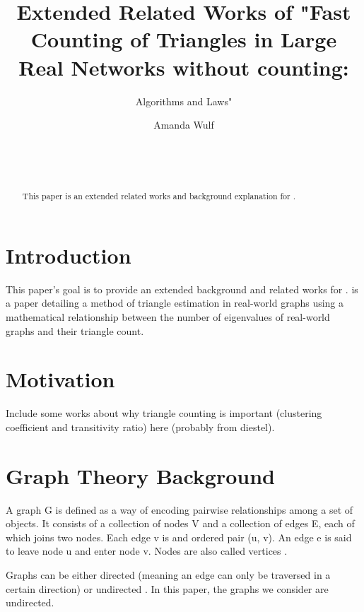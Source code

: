 \documentclass{acm_proc_article-sp}
\begin{document}
\title{Extended Related Works of "Fast Counting of Triangles in Large Real Networks without counting:}
\subtitle{Algorithms and Laws"}

\author{
\alignauthor
Amanda Wulf\\
       \\
       \\
       \\
}

\maketitle
\begin{abstract}
This paper is an extended related works and background explanation for
\cite{original}.
\end{abstract}

\section{Introduction}
This paper's goal is to provide an extended background and related works for
\cite{original}. \cite{original} is a paper detailing a method of triangle
estimation in real-world graphs using a mathematical relationship between the
number of eigenvalues of real-world graphs and their triangle count.

\section{Motivation}
Include some works about why triangle counting is important
(clustering coefficient and transitivity ratio) here (probably from diestel).

\section{Graph Theory Background}
A graph G is defined as a way of encoding pairwise relationships among a set of
objects. It consists of a collection of nodes V and a collection of edges E, each
of which joins two nodes. Each edge v is and ordered pair (u, v). An edge e is
said to leave node u and enter node v. Nodes are also called vertices
\cite{kleinberg}.

Graphs can be either directed (meaning an edge can only be traversed in a
certain direction) or undirected \cite{kleinberg}. In this paper, the graphs we
consider are undirected.
\end{document}
